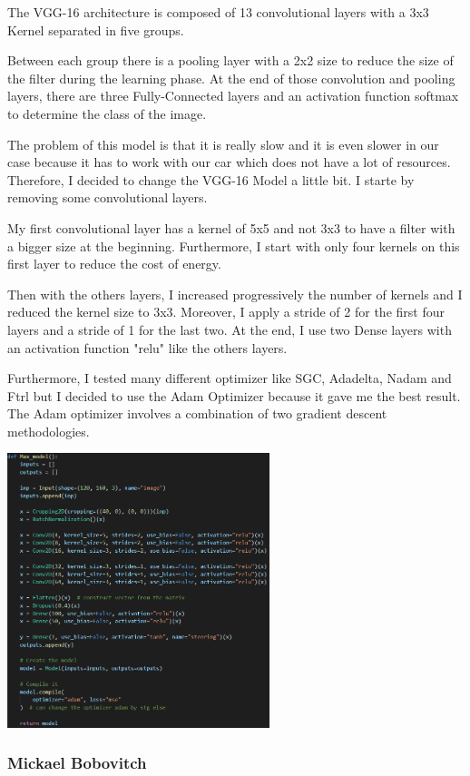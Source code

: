 \documentclass[12pt]{article}
\begin{document}
The VGG-16 architecture is composed of 13 convolutional layers with a 3x3 Kernel separated in five groups.

Between each group there is a pooling layer with a 2x2 size to reduce the size of the filter during the learning phase. At the end of those convolution and pooling layers, there are three Fully-Connected layers and an activation function softmax to determine the class of the image.


The problem of this model is that it is really slow and it is even slower in our case because it has to work with our car which does not have a lot of resources. Therefore, I decided to change the VGG-16 Model a little bit. 
I starte by removing some convolutional layers.

My first convolutional layer has a kernel of 5x5 and not 3x3 to have a filter with a bigger size at the beginning. Furthermore, I start with only four kernels on this first layer to reduce the cost of energy.

Then with the others layers, I increased progressively the number of kernels and I reduced the kernel size to 3x3. Moreover, I apply a stride of 2 for the first four layers and a stride of 1 for the last two. At the end, I use two Dense layers with an activation function "relu" like the others layers.


Furthermore, I tested many different optimizer like SGC, Adadelta, Nadam and Ftrl but I decided to use the Adam Optimizer because it gave me the best result. The Adam optimizer involves a combination of two gradient descent methodologies.

\centerline{\includegraphics[height=8cm]{../../docs/model maxg.png}}


\subsubsection{Mickael Bobovitch}
\end{document}
